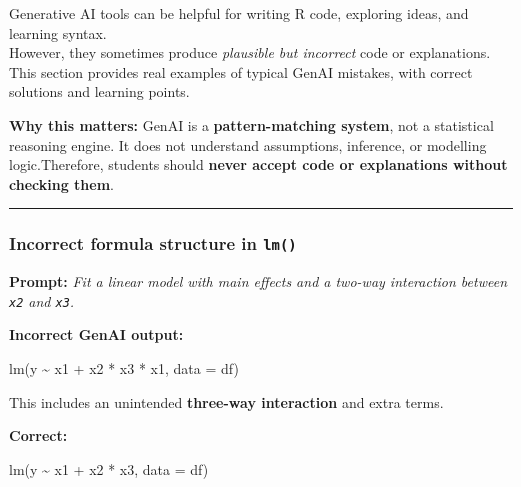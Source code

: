 \documentclass[
  letterpaper,
  8pt,
  a4paper]{book}
\newenvironment{Shaded}{\begin{snugshade}}{\end{snugshade}}
\newcommand{\AttributeTok}[1]{\textcolor[rgb]{0.40,0.45,0.13}{#1}}
\newcommand{\FunctionTok}[1]{\textcolor[rgb]{0.28,0.35,0.67}{#1}}
\newcommand{\NormalTok}[1]{\textcolor[rgb]{0.00,0.23,0.31}{#1}}
\newcommand{\SpecialCharTok}[1]{\textcolor[rgb]{0.37,0.37,0.37}{#1}}
\begin{document}
Generative AI tools can be helpful for writing R code, exploring ideas,
and learning syntax.\\
However, they sometimes produce \emph{plausible but incorrect} code or
explanations.\\
This section provides real examples of typical GenAI mistakes, with
correct solutions and learning points.

\textbf{Why this matters:} GenAI is a \textbf{pattern-matching system},
not a statistical reasoning engine. It does not understand assumptions,
inference, or modelling logic.Therefore, students should \textbf{never
accept code or explanations without checking them}.

\begin{center}\rule{0.5\linewidth}{0.5pt}\end{center}

\subsubsection*{\texorpdfstring{Incorrect formula structure in
\texttt{lm()}}{Incorrect formula structure in lm()}}\label{incorrect-formula-structure-in-lm}

\textbf{Prompt:} \emph{Fit a linear model with main effects and a
two-way interaction between \texttt{x2} and \texttt{x3}.}

\textbf{Incorrect GenAI output:}

\begin{Shaded}
\begin{Highlighting}[]
\FunctionTok{lm}\NormalTok{(y }\SpecialCharTok{\textasciitilde{}}\NormalTok{ x1 }\SpecialCharTok{+}\NormalTok{ x2 }\SpecialCharTok{*}\NormalTok{ x3 }\SpecialCharTok{*}\NormalTok{ x1, }\AttributeTok{data =}\NormalTok{ df)}
\end{Highlighting}
\end{Shaded}

This includes an unintended \textbf{three-way interaction} and extra
terms.

\textbf{Correct:}

\begin{Shaded}
\begin{Highlighting}[]
\FunctionTok{lm}\NormalTok{(y }\SpecialCharTok{\textasciitilde{}}\NormalTok{ x1 }\SpecialCharTok{+}\NormalTok{ x2 }\SpecialCharTok{*}\NormalTok{ x3, }\AttributeTok{data =}\NormalTok{ df)}
\end{Highlighting}
\end{Shaded}
\end{document}
